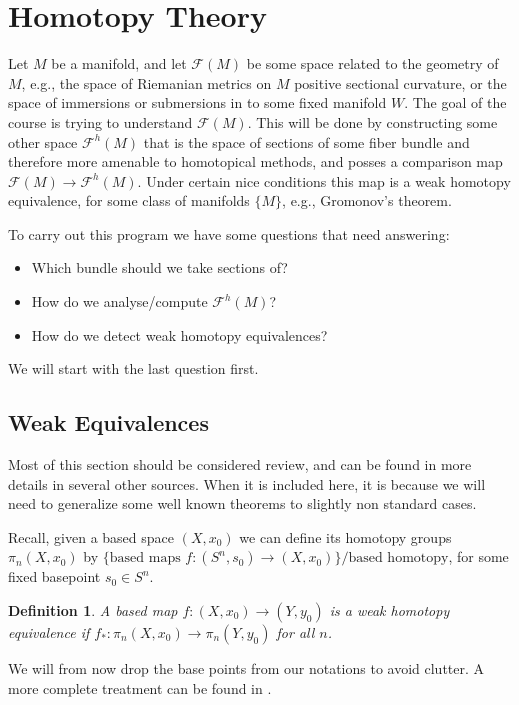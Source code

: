\documentclass{article}
\newtheorem{definition}[theorem]{Definition}
\newtheorem{proposed work}[theorem]{Proposed Work}
\begin{document}
\section{Homotopy Theory}
Let $M$ be a manifold, and let $\mathcal{F}(M)$ be some space related to the geometry of $M$, e.g., the space of Riemanian metrics on $M$ positive sectional curvature, or the space of immersions or submersions in to some fixed manifold $W$. The goal of the course is trying to understand $\mathcal{F}(M)$. This will be done by constructing some other space $\mathcal{F}^h(M)$ that is the space of sections of some fiber bundle and therefore more amenable to homotopical methods, and posses a comparison map $\mathcal{F}(M)\to \mathcal{F}^h(M)$. Under certain nice conditions this map is a weak homotopy equivalence, for some class of manifolds $\{M\}$, e.g., Gromonov's theorem.

To carry out this program we have some questions that need answering:
\begin{itemize}
\item Which bundle should we take sections of?
\item How do we analyse/compute $\mathcal{F}^h(M)$?
\item How do we detect weak homotopy equivalences? 
\end{itemize} 
We will start with the last question first.

\subsection{Weak Equivalences}
Most of this section should be considered review, and can be found in more details in several other sources. When it is included here, it is because we will need to generalize some well known theorems to slightly non standard cases.

Recall, given a based space $(X,x_0)$ we can define its homotopy groups $\pi_n(X,x_0)$ by $\{\text{based maps }f:(S^n,s_0)\to (X,x_0)\}/\text{based homotopy}$, for some fixed basepoint $s_0\in S^n$. 
\begin{definition}
A based map $f:(X,x_0)\to (Y,y_0)$ is a weak homotopy equivalence if $f_*:\pi_n(X,x_0)\to \pi_n(Y,y_0)$ for all $n$.
\end{definition}
We will from now drop the base points from our notations to avoid clutter. A more complete treatment can be found in \cite{may1999concise}.
\end{document}
